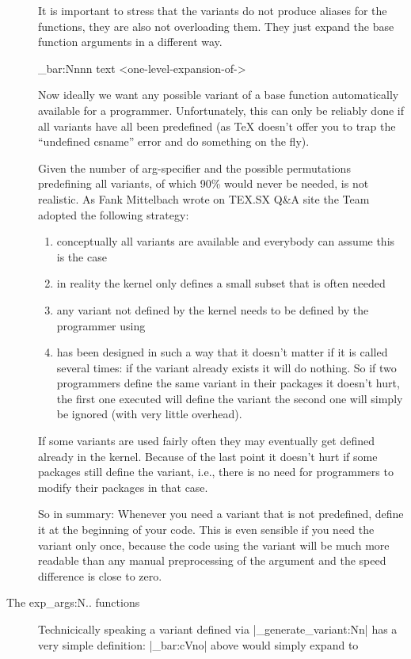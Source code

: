 \begin{description}
It is important to stress that the variants do not produce aliases for the functions, they are also not overloading them. They just expand the base function arguments in a different way. 

\begin{teXXX}
 \foo_bar:Nnnn  {text} {<one-level-expansion-of-\CMD>}
\end{teXXX}

Now ideally we want any possible variant of a base function automatically available for a programmer. Unfortunately, this can only be reliably done if all variants have all been predefined (as TeX doesn't offer you to trap the \enquote{undefined csname} error and do something on the fly).

Given the number of arg-specifier and the possible permutations predefining all variants, of which 90\% would never be needed, is not realistic. As Fank Mittelbach wrote on TEX.SX Q\&A site the  Team adopted the following strategy:

\begin{enumerate}
\item conceptually all variants are available and everybody can assume this is the case

\item in reality the kernel only defines a small subset that is often needed

\item any variant not defined by the kernel needs to be defined by the programmer using 

\item {} has been designed in such a way that it doesn't matter if it is called several times: if the variant already exists it will do nothing. So if two programmers define the same variant in their packages it doesn't hurt, the first one executed will define the variant the second one will simply be ignored (with very little overhead).
\end{enumerate}

If some variants are used fairly often they may eventually get defined already in the kernel. Because of the last point it doesn't hurt if some packages still define the variant, i.e., there is no need for programmers to modify their packages in that case.

So in summary: Whenever you need a variant that is not predefined, define it at the beginning of your code. This is even sensible if you need the variant only once, because the code using the variant will be much more readable than any manual preprocessing of the argument and the speed difference is close to zero.

\item[The exp\_args:N.. functions]

Technicically speaking a variant defined via |\cs_generate_variant:Nn| has a very simple definition: |\foo_bar:cVno| above would simply expand to
\end{description}

